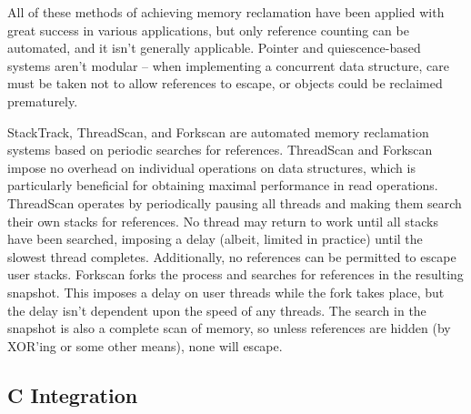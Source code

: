 All of these methods of achieving memory reclamation have been applied with great success in various applications, but only reference counting can be automated, and it isn't generally applicable.  Pointer and quiescence-based systems aren't modular -- when implementing a concurrent data structure, care must be taken not to allow references to escape, or objects could be reclaimed prematurely.

StackTrack\cite{StackTrack}, ThreadScan\cite{Threadscan}, and Forkscan\cite{Forkscan} are automated memory reclamation systems based on periodic searches for references.  ThreadScan and Forkscan impose no overhead on individual operations on data structures, which is particularly beneficial for obtaining maximal performance in read operations.  ThreadScan operates by periodically pausing all threads and making them search their own stacks for references.  No thread may return to work until all stacks have been searched, imposing a delay (albeit, limited in practice) until the slowest thread completes.  Additionally, no references can be permitted to escape user stacks.  Forkscan forks the process and searches for references in the resulting snapshot.  This imposes a delay on user threads while the fork takes place, but the delay isn't dependent upon the speed of any threads.  The search in the snapshot is also a complete scan of memory, so unless references are hidden (by XOR'ing or some other means), none will escape.

\subsection{C Integration}
